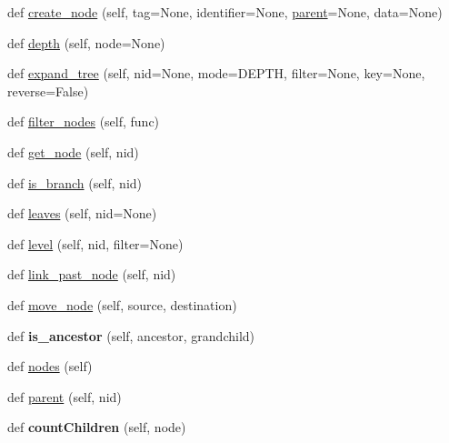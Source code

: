 \begin{DoxyCompactItemize}
def \mbox{\hyperlink{classtreelib_1_1tree_1_1Tree_a4b70a6cf20c1197b1b04e139e7bd4110}{create\+\_\+node}} (self, tag=None, identifier=None, \mbox{\hyperlink{classtreelib_1_1tree_1_1Tree_a5b3ff09f1a10d49460888cdfa2c5ac0d}{parent}}=None, data=None)
\item 
def \mbox{\hyperlink{classtreelib_1_1tree_1_1Tree_a890a44d3244ac67247322719d9228163}{depth}} (self, node=None)
\item 
def \mbox{\hyperlink{classtreelib_1_1tree_1_1Tree_ac6b3fbe0c1b1b6b906306b9925e3011a}{expand\+\_\+tree}} (self, nid=None, mode=D\+E\+P\+TH, filter=None, key=None, reverse=False)
\item 
def \mbox{\hyperlink{classtreelib_1_1tree_1_1Tree_ae251cc543bdc07c80290cf5a3d6eb560}{filter\+\_\+nodes}} (self, func)
\item 
def \mbox{\hyperlink{classtreelib_1_1tree_1_1Tree_a0f2ed5ef9b4f364c872435f1a170a9c5}{get\+\_\+node}} (self, nid)
\item 
def \mbox{\hyperlink{classtreelib_1_1tree_1_1Tree_a15a76763504c43369635e2f262d1678b}{is\+\_\+branch}} (self, nid)
\item 
def \mbox{\hyperlink{classtreelib_1_1tree_1_1Tree_a6bd72744ae2728143a611f3b32eeb763}{leaves}} (self, nid=None)
\item 
def \mbox{\hyperlink{classtreelib_1_1tree_1_1Tree_a4c1fa1eb04b6c8b4613a34425207c07e}{level}} (self, nid, filter=None)
\item 
def \mbox{\hyperlink{classtreelib_1_1tree_1_1Tree_a8f9e29d59e9ec0b689d9321c7c2358a7}{link\+\_\+past\+\_\+node}} (self, nid)
\item 
def \mbox{\hyperlink{classtreelib_1_1tree_1_1Tree_a4ce0af34154a2903c4692eb195e114b9}{move\+\_\+node}} (self, source, destination)
\item 
\mbox{\label{classtreelib_1_1tree_1_1Tree_ad618f6ac43b0daeda257850549b5d576}} 
def {\bfseries is\+\_\+ancestor} (self, ancestor, grandchild)
\item 
def \mbox{\hyperlink{classtreelib_1_1tree_1_1Tree_a831a9ee3ed8a2e5da20853745cc92746}{nodes}} (self)
\item 
def \mbox{\hyperlink{classtreelib_1_1tree_1_1Tree_a5b3ff09f1a10d49460888cdfa2c5ac0d}{parent}} (self, nid)
\item 
\mbox{\label{classtreelib_1_1tree_1_1Tree_a8a45acb9098d54865cc1716b9c555068}} 
def {\bfseries count\+Children} (self, node)
\item 

\end{DoxyCompactItemize}
